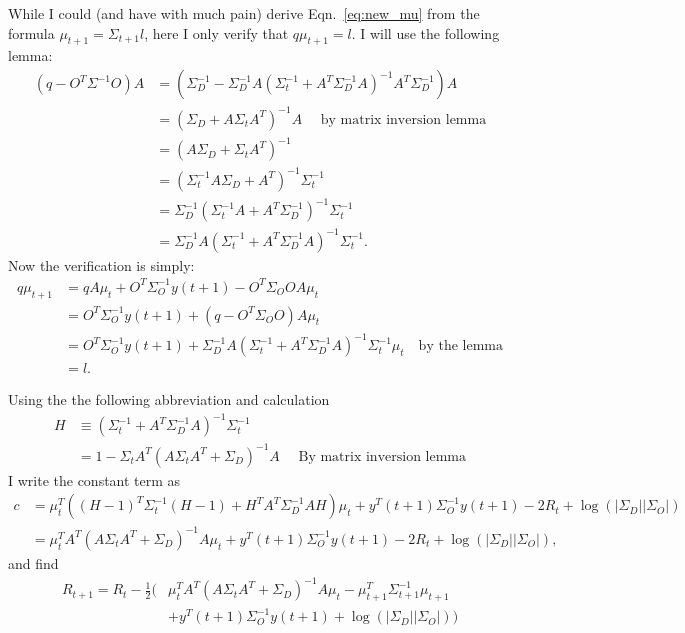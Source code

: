 \documentclass[12pt]{article}
\newcommand{\ti}[2]{{#1}{(#2)}}                         %
\newcommand{\logdet}{\log\left(\left|\Sigma_D\right| \left| \Sigma_O
    \right| \right)}
\begin{document}
While I could (and have with much pain) derive Eqn.~\eqref{eq:new_mu}
from the formula $\mu_{t+1} = \Sigma_{t+1} l$, here I only verify that
$q \mu_{t+1} = l$.  I will use the following lemma:
\begin{align*}
  (q-O^T\Sigma^{-1}O)A &= \left( \Sigma_D^{-1} - \Sigma_D^{-1} A (
    \Sigma_t^{-1} + A^T \Sigma_D^{-1} A)^{-1} A^T \Sigma_D^{-1}
  \right) A \\
  &= (\Sigma_D + A \Sigma_t A^T)^{-1} A \quad \text{ by matrix inversion
    lemma} \\
  &= (A \Sigma_D + \Sigma_t A^T)^{-1} \\
  &= (\Sigma_t^{-1} A \Sigma_D + A^T)^{-1} \Sigma_t^{-1}\\
  &= \Sigma_D^{-1} (\Sigma_t^{-1} A  + A^T\Sigma_D^{-1})^{-1} \Sigma_t^{-1}\\
  &= \Sigma_D^{-1} A (\Sigma_t^{-1}  + A^T\Sigma_D^{-1} A)^{-1} \Sigma_t^{-1}.
\end{align*}
Now the verification is simply:
\begin{align*}
  q \mu_{t+1} &= qA\mu_t + O^T \Sigma_O^{-1} \ti{y}{t+1} - O^T
  \Sigma_O O A \mu_t \\
  &= O^T \Sigma_O^{-1} \ti{y}{t+1} + (q - O^T \Sigma_O O) A \mu_t \\
  &= O^T\Sigma_O^{-1}y(t+1) + \Sigma_D^{-1}A \left( \Sigma_t^{-1} +
    A^T \Sigma_D^{-1} A \right)^{-1} \Sigma_t^{-1} \mu_t \quad \text{
    by the lemma}\\
  &= l.
\end{align*}

Using the the following abbreviation and calculation
\begin{align*}
  H &\equiv (\Sigma_t^{-1} + A^T \Sigma_D^{-1}A)^{-1} \Sigma_t^{-1} \\
  &= 1 - \Sigma_t A^T(A\Sigma_t A^T + \Sigma_D)^{-1} A \quad \text{ By
    matrix inversion lemma}
\end{align*}
I write the constant term as
\begin{align*}
  c &= \mu_t^T \left( (H-1)^T\Sigma_t^{-1} (H-1) + H^TA^T\Sigma_D^{-1}
    AH \right) \mu_t + \ti{y^T}{t+1} \Sigma_O^{-1}
  \ti{y}{t+1} - 2R_t + \logdet\\
  &= \mu_t^T  A^T(A\Sigma_t A^T + \Sigma_D)^{-1}A \mu_t
  + \ti{y^T}{t+1} \Sigma_O^{-1} \ti{y}{t+1} - 2R_t  + \logdet,
\end{align*}
and find
\begin{align*}
  R_{t+1} = R_t -\frac{1}{2} \Big( &
  \mu_t^T  A^T(A\Sigma_t A^T + \Sigma_D)^{-1}A \mu_t 
   - \mu_{t+1}^T \Sigma_{t+1}^{-1} \mu_{t+1} \\
  & + \ti{y^T}{t+1} \Sigma_O^{-1} \ti{y}{t+1} + \logdet \Big)
\end{align*}
\end{document}
